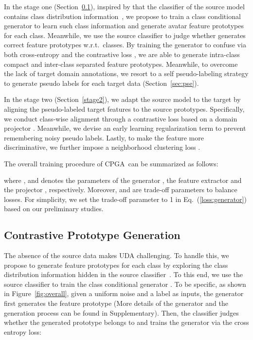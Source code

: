 \documentclass{article}
\def\wrt{w.r.t.~}
\def\ournet{CPGA}
\begin{document}
 
In the stage one (Section~\ref{stage1}), inspired by that the classifier of the source model contains class distribution information~\cite{Xu2020GenerativeLD}, we propose to train a class conditional generator  to learn such class information and generate avatar feature prototypes for each class. Meanwhile, we use the source classifier  to judge whether  generates correct feature prototypes \wrt classes. By training the generator  to confuse   via both cross-entropy  and the contrastive loss , we are able to generate intra-class compact and inter-class separated feature prototypes.  
Meanwhile, to overcome the lack of target domain annotations, we resort to a self pseudo-labeling strategy to generate pseudo labels for each target data (Section~\ref{sec:pse}).

In the stage two (Section~\ref{stage2}), we adapt the source model to the target by aligning the pseudo-labeled target features to the source prototypes.  Specifically, we conduct class-wise alignment through a contrastive loss  based on a domain projector . Meanwhile,  we devise an early learning regularization term  to prevent remembering noisy pseudo labels. Lastly, to make the feature more discriminative, we further impose a neighborhood clustering loss .  


The overall training procedure of \ournet~can be summarized as follows:

\vspace{-3.5mm}

where ,  and  denotes the parameters of the generator , the feature extractor  and the projector , respectively. Moreover,   and  are  trade-off parameters to balance losses. For simplicity, we set the trade-off parameter to 1  in Eq.~(\ref{loss:generator}) based on our preliminary studies.



\subsection{Contrastive Prototype Generation}\label{stage1}
The absence of the source data makes UDA challenging. To handle this, we propose to generate feature prototypes for each class by exploring the class distribution information hidden in the source classifier~\cite{Xu2020GenerativeLD}. To this end, we use the source classifier   to train the class conditional generator . 
To be specific, as shown in Figure~\ref{fig:overall}, given a uniform noise  and a label  as inputs, the generator  first generates the feature prototype  (More details of the generator and the generation process can be found in Supplementary). Then, the classifier  judges whether the generated prototype belongs to  and trains the generator via the cross entropy loss:
\end{document}
